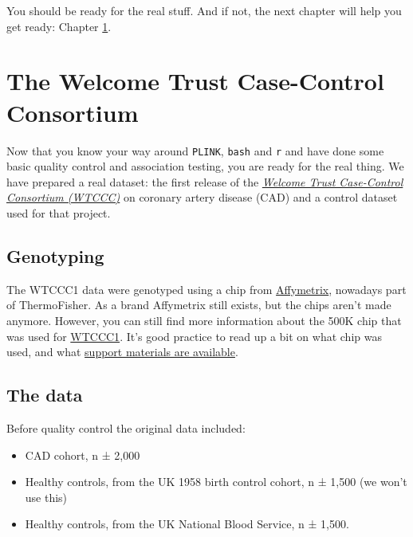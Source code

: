 \documentclass[
]{book}
\newcommand{\passthrough}[1]{#1}
\providecommand{\tightlist}{%
  \setlength{\itemsep}{0pt}\setlength{\parskip}{0pt}}
\begin{document}
You should be ready for the real stuff. And if not, the next chapter will help you get ready: Chapter \ref{wtccc1-intro}.

\hypertarget{wtccc1-intro}{%
\chapter{The Welcome Trust Case-Control Consortium}\label{wtccc1-intro}}

Now that you know your way around \passthrough{\lstinline!PLINK!}, \passthrough{\lstinline!bash!} and \passthrough{\lstinline!r!} and have done some basic quality control and association testing, you are ready for the real thing. We have prepared a real dataset: the first release of the \href{https://www.wtccc.org.uk/ccc1/overview.html}{\emph{Welcome Trust Case-Control Consortium (WTCCC)}} on coronary artery disease (CAD) and a control dataset used for that project.

\hypertarget{genotyping}{%
\section{Genotyping}\label{genotyping}}

The WTCCC1 data were genotyped using a chip from \href{https://www.thermofisher.com/us/en/home/life-science/microarray-analysis/affymetrix.html?category=34000\&categoryIdClicked=34000\&rootCategoryId=34000\&navMode=34000\&aId=productsNav}{Affymetrix}, nowadays part of ThermoFisher. As a brand Affymetrix still exists, but the chips aren't made anymore. However, you can still find more information about the 500K chip that was used for \href{http://www.affymetrix.com/support/technical/datasheets/500k_datasheet.pdf}{WTCCC1}. It's good practice to read up a bit on what chip was used, and what \href{http://www.affymetrix.com/support/technical/byproduct.affx?product=500k}{support materials are available}.

\hypertarget{the-data}{%
\section{The data}\label{the-data}}

Before quality control the original data included:

\begin{itemize}
\tightlist
\item
  CAD cohort, n ± 2,000
\item
  Healthy controls, from the UK 1958 birth control cohort, n ± 1,500 (we won't use this)
\item
  Healthy controls, from the UK National Blood Service, n ± 1,500.
\end{itemize}
\end{document}
